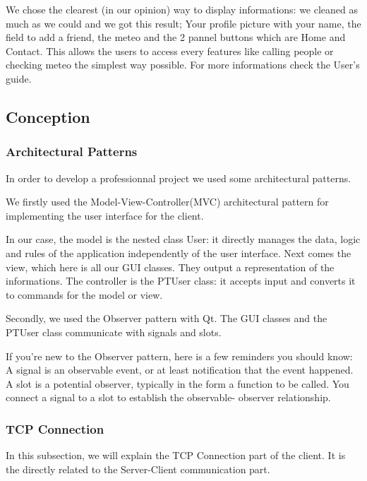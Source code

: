 \documentclass{article}
\begin{document}
  \bigskip
  We chose the clearest (in our opinion) way to display informations: we cleaned as much as we could and we got this result; Your profile picture with your name, the field to add a friend, the meteo and the 2 pannel buttons which are Home and Contact.
  This allows the users to access every features like calling people or checking meteo the simplest way possible. For more informations check the User's guide.

  \newpage

  \subsection{Conception}

  \subsubsection{Architectural Patterns}

  In order to develop a professionnal project we used some architectural patterns.

  \bigskip
  We firstly used the Model-View-Controller(MVC) architectural pattern for implementing the user interface for the client.

 In our case, the model is the nested class User: it directly manages the data, logic and rules of the application independently of the user interface.
 Next comes the view, which here is all our GUI classes. They output a representation of the informations.
 The controller is the PTUser class: it accepts input and converts it to commands for the model or view.
 \bigskip

 Secondly, we used the Observer pattern with Qt. The GUI classes and the PTUser class communicate with signals and slots.

 \bigskip

 If you're new to the Observer pattern, here is a few reminders you should know:
 A signal is an observable event, or at least notification that the event happened.
 A slot is a potential observer, typically in the form a function to be called.
 You connect a signal to a slot to establish the observable- observer relationship.

 \newpage
 \subsubsection{TCP Connection}

 In this subsection, we will explain the TCP Connection part of the client. It is the directly related to the Server-Client communication part.
\end{document}
